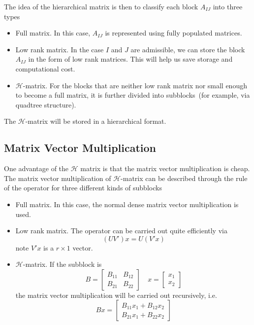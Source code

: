 \documentclass[10pt,a4paper]{article}
\theoremstyle{definition}
\begin{document}
The idea of the hierarchical matrix is then to classify each block $A_{IJ}$ into three types
\begin{itemize}
\item Full matrix. In this case, $A_{IJ}$ is represented using fully populated matrices.
\item Low rank matrix. In the case $I$ and $J$ are admissible, we can store the block $A_{IJ}$ in the form of low rank matrices. This will help us save storage and computational cost.
	\item $\mathcal{H}$-matrix. For the blocks that are neither low rank matrix nor small enough to become a full matrix, it is further divided into subblocks~(for example, via quadtree structure). 
\end{itemize}

The $\mathcal{H}$-matrix will be stored in a hierarchical format. 


\subsection{Matrix Vector Multiplication}

One advantage of the $\mathcal{H}$ matrix is that the matrix vector multiplication is cheap. The matrix vector multiplication of $\mathcal{H}$-matrix can be described through the rule of the operator for three different kinds of subblocks
\begin{itemize}
	\item Full matrix. In this case, the normal dense matrix vector multiplication is used. 
	\item Low rank matrix. The operator can be carried out quite efficiently via
	\begin{equation}
		(UV')x = U(V'x)
	\end{equation}
	note $V'x$ is a $r\times 1$ vector.
	\item $\mathcal{H}$-matrix. If the subblock is 
	\begin{equation}
		B = \begin{bmatrix}
			B_{11}&B_{12}\\
			B_{21}&B_{22}
		\end{bmatrix}\quad x = \begin{bmatrix}
			x_1\\
			x_2
		\end{bmatrix}
	\end{equation}
	the matrix vector multiplication will be carried out recursively, i.e.
	\begin{equation}
		Bx = \begin{bmatrix}
			B_{11} x_1 + B_{12}x_2\\
			B_{21} x_1 + B_{22}x_2
		\end{bmatrix}
	\end{equation}
\end{itemize}
\end{document}
